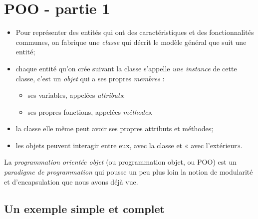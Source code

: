 \documentclass[a4paper,10pt,cours,firamath]{nsi}
\begin{document}
\chapter{POO - partie 1}


\begin{aretenir}
    \begin{itemize}
        \item     Pour représenter des  entités qui ont des caractéristiques et des fonctionnalités communes, on fabrique  une \textit{classe} qui décrit le modèle général que suit une entité;
        \item     chaque entité qu'on crée suivant la classe s'appelle \textit{une instance} de cette classe, c'est un \textit{objet} qui a ses propres \textit{membres} :
              \begin{itemize}
                  \item     ses variables, appelées \textit{attributs};
                  \item     ses propres fonctions, appelées \textit{méthodes}.
              \end{itemize}
        \item     la classe elle même peut avoir ses propres attributs et méthodes;
        \item     les objets peuvent interagir entre eux, avec la classe et « avec l'extérieur».
    \end{itemize}
    
\end{aretenir}

La \textit{programmation orientée objet} (ou programmation objet, ou POO) est un \textit{paradigme de programmation} qui pousse un peu plus loin la notion de modularité et d'encapsulation que nous avons déjà vue. 

\section{Un exemple simple et complet}
\end{document}
